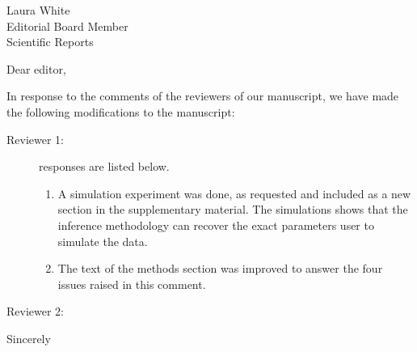 \documentclass[a4paper,10pt]{letter}
\begin{document}

\begin{letter}{Laura White\\Editorial Board Member\\Scientific Reports }
\address{Escola de Matem\'atica Aplicada\\Funda\c{c}\~ao Getulio Vargas 
(FGV)\\Rio de Janeiro -- RJ\\Brazil.}

\opening{Dear editor,}

In response to the comments of the reviewers of our manuscript, we have made 
the following modifications to the manuscript:

\begin{description}
 \item[Reviewer 1:] responses are listed below. 
 
 \begin{enumerate}
  \item A simulation experiment was done, as requested and included as a new 
section in the supplementary material. The simulations shows that the inference 
methodology can recover the exact parameters user to simulate  the data.
\item The text of the methods section was improved to answer the four issues 
raised in this comment.
 \end{enumerate}

 \item [Reviewer 2:]
\end{description}



\signature{Flávio Codeço Coelho\\Professor}

\closing{Sincerely}


\end{letter}
\end{document}
